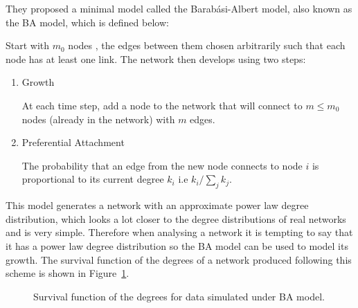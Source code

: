 \documentclass[
]{article}
\begin{document}
They proposed a minimal model called the Barabási-Albert model, also
known as the BA model, which is defined below:

Start with \(m_0\) nodes , the edges between them chosen arbitrarily
such that each node has at least one link. The network then develops
using two steps:

\begin{enumerate}
\def\labelenumi{\arabic{enumi}.}
\item
  Growth

  At each time step, add a node to the network that will connect to
  \(m\le m_0\) nodes (already in the network) with \(m\) edges.
\item
  Preferential Attachment

  The probability that an edge from the new node connects to node \(i\)
  is proportional to its current degree \(k_i\) i.e \(k_i/\sum_{j}k_j\).
\end{enumerate}

This model generates a network with an approximate power law degree
distribution, which looks a lot closer to the degree distributions of
real networks and is very simple. Therefore when analysing a network it
is tempting to say that it has a power law degree distribution so the BA
model can be used to model its growth. The survival function of the
degrees of a network produced following this scheme is shown in
Figure~\ref{fig-surv-sim}.

\begin{figure}[H]


\caption{\label{fig-surv-sim}Survival function of the degrees for data
simulated under BA model.}

\end{figure}%
\end{document}
